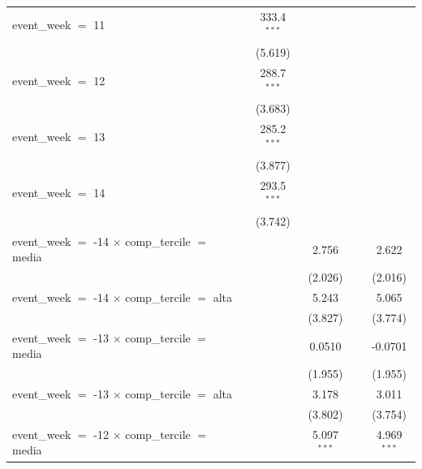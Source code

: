 \begin{tabular}{lcccc}
   event\_week $=$ 11                                      & 333.4$^{***}$  &               &              &   \\   
                                                           & (5.619)        &               &              &   \\   
   event\_week $=$ 12                                      & 288.7$^{***}$  &               &              &   \\   
                                                           & (3.683)        &               &              &   \\   
   event\_week $=$ 13                                      & 285.2$^{***}$  &               &              &   \\   
                                                           & (3.877)        &               &              &   \\   
   event\_week $=$ 14                                      & 293.5$^{***}$  &               &              &   \\   
                                                           & (3.742)        &               &              &   \\   
   event\_week $=$ -14 $\times$ comp\_tercile $=$ media    &                & 2.756         &              & 2.622\\   
                                                           &                & (2.026)       &              & (2.016)\\   
   event\_week $=$ -14 $\times$ comp\_tercile $=$ alta     &                & 5.243         &              & 5.065\\   
                                                           &                & (3.827)       &              & (3.774)\\   
   event\_week $=$ -13 $\times$ comp\_tercile $=$ media    &                & 0.0510        &              & -0.0701\\   
                                                           &                & (1.955)       &              & (1.955)\\   
   event\_week $=$ -13 $\times$ comp\_tercile $=$ alta     &                & 3.178         &              & 3.011\\   
                                                           &                & (3.802)       &              & (3.754)\\   
   event\_week $=$ -12 $\times$ comp\_tercile $=$ media    &                & 5.097$^{***}$ &              & 4.969$^{***}$\\   

\end{tabular}
